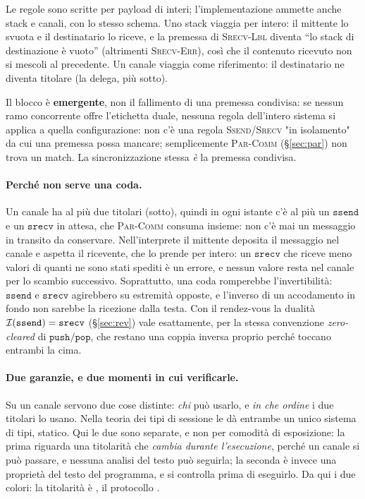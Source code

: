 \medskip
\noindent
Le regole sono scritte per payload di interi; l'implementazione ammette anche
stack e canali, con lo stesso schema. Uno stack viaggia per intero: il
mittente lo svuota e il destinatario lo riceve, e la premessa di
\textsc{Srecv-Lbl} diventa ``lo stack di destinazione è vuoto'' (altrimenti
\textsc{Srecv-Err}), così che il contenuto ricevuto non si mescoli al
precedente. Un canale viaggia come riferimento: il destinatario ne diventa
titolare (la delega, più sotto).

\medskip
\noindent
Il blocco è \textbf{emergente}, non il fallimento di una premessa
condivisa: se nessun ramo concorrente offre l'etichetta duale, nessuna
regola dell'intero sistema si applica a quella configurazione: non c'è una
regola \textsc{Ssend}/\textsc{Srecv} "in isolamento" da cui una premessa
possa mancare; semplicemente \textsc{Par-Comm} (\S\ref{sec:par}) non trova
un match. La sincronizzazione stessa \emph{è} la premessa condivisa.

\paragraph{Perché non serve una coda.} Un canale ha al più due titolari
(sotto), quindi in ogni istante c'è al più un $\mathtt{ssend}$ e un
$\mathtt{srecv}$ in attesa, che \textsc{Par-Comm} consuma insieme: non c'è mai
un messaggio in transito da conservare. Nell'interprete il mittente deposita il
messaggio nel canale e aspetta il ricevente, che lo prende per intero: un
$\mathtt{srecv}$ che riceve meno valori di quanti ne sono stati spediti è un
errore, e nessun valore resta nel canale per lo scambio successivo. Soprattutto, una coda romperebbe
l'invertibilità: $\mathtt{ssend}$ e $\mathtt{srecv}$ agirebbero su estremità
opposte, e l'inverso di un accodamento in fondo non sarebbe la ricezione dalla
testa. Con il rendez-vous la dualità $\mathcal{I}(\mathtt{ssend}) = \mathtt{srecv}$
(\S\ref{sec:rev}) vale esattamente, per la stessa convenzione
\emph{zero-cleared} di $\mathtt{push}/\mathtt{pop}$, che restano una coppia
inversa proprio perché toccano entrambi la cima.

\paragraph{Due garanzie, e due momenti in cui verificarle.} Su un canale servono
due cose distinte: \emph{chi} può usarlo, e \emph{in che ordine} i due titolari
lo usano. Nella teoria dei tipi di sessione le dà entrambe un unico sistema di
tipi, statico. Qui le due sono separate, e non per comodità di esposizione: la
prima riguarda una titolarità che \emph{cambia durante l'esecuzione}, perché un
canale si può passare, e nessuna analisi del testo può seguirla; la seconda è
invece una proprietà del testo del programma, e si controlla prima di eseguirlo.
Da qui i due colori: la titolarità è , il
protocollo .

